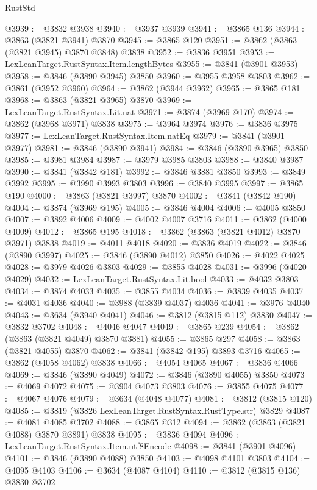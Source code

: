 \begin{lexlean}{RustStd}
\begin{coremodule}
@3939 := @3832 @3938
@3940 := @3937 @3939
@3941 := @3865 @136
@3944 := @3863 (@3821 @3941) @3870
@3945 := @3865 @120
@3951 := @3862 (@3863 (@3821 @3945) @3870 @3848) @3838
@3952 := @3836 @3951
@3953 := LexLeanTarget.RustSyntax.Item.lengthBytes
@3955 := @3841 (@3901 @3953)
@3958 := @3846 (@3890 @3945) @3850
@3960 := @3955 @3958 @3803
@3962 := @3861 (@3952 @3960)
@3964 := @3862 (@3944 @3962)
@3965 := @3865 @181
@3968 := @3863 (@3821 @3965) @3870
@3969 := LexLeanTarget.RustSyntax.Lit.nat
@3971 := @3874 (@3969 @170)
@3974 := @3862 (@3968 @3971) @3838
@3975 := @3964 @3974
@3976 := @3836 @3975
@3977 := LexLeanTarget.RustSyntax.Item.natEq
@3979 := @3841 (@3901 @3977)
@3981 := @3846 (@3890 @3941)
@3984 := @3846 (@3890 @3965) @3850
@3985 := @3981 @3984
@3987 := @3979 @3985 @3803
@3988 := @3840 @3987
@3990 := @3841 (@3842 @181)
@3992 := @3846 @3881 @3850
@3993 := @3849 @3992
@3995 := @3990 @3993 @3803
@3996 := @3840 @3995
@3997 := @3865 @190
@4000 := @3863 (@3821 @3997) @3870
@4002 := @3841 (@3842 @190)
@4004 := @3874 (@3969 @195)
@4005 := @3846 @4004
@4006 := @4005 @3850
@4007 := @3892 @4006
@4009 := @4002 @4007 @3716
@4011 := @3862 (@4000 @4009)
@4012 := @3865 @195
@4018 := @3862 (@3863 (@3821 @4012) @3870 @3971) @3838
@4019 := @4011 @4018
@4020 := @3836 @4019
@4022 := @3846 (@3890 @3997)
@4025 := @3846 (@3890 @4012) @3850
@4026 := @4022 @4025
@4028 := @3979 @4026 @3803
@4029 := @3855 @4028
@4031 := @3996 (@4020 @4029)
@4032 := LexLeanTarget.RustSyntax.Lit.bool
@4033 := @4032 @3803
@4034 := @3874 @4033
@4035 := @3855 @4034
@4036 := @3839 @4035
@4037 := @4031 @4036
@4040 := @3988 (@3839 @4037) @4036
@4041 := @3976 @4040
@4043 := @3634 (@3940 @4041)
@4046 := @3812 (@3815 @112) @3830
@4047 := @3832 @3702
@4048 := @4046 @4047
@4049 := @3865 @239
@4054 := @3862 (@3863 (@3821 @4049) @3870 @3881)
@4055 := @3865 @297
@4058 := @3863 (@3821 @4055) @3870
@4062 := @3841 (@3842 @195) @3893 @3716
@4065 := @3862 (@4058 @4062) @3838
@4066 := @4054 @4065
@4067 := @3836 @4066
@4069 := @3846 (@3890 @4049)
@4072 := @3846 (@3890 @4055) @3850
@4073 := @4069 @4072
@4075 := @3904 @4073 @3803
@4076 := @3855 @4075
@4077 := @4067 @4076
@4079 := @3634 (@4048 @4077)
@4081 := @3812 (@3815 @120)
@4085 := @3819 (@3826 LexLeanTarget.RustSyntax.RustType.str) @3829
@4087 := @4081 @4085 @3702
@4088 := @3865 @312
@4094 := @3862 (@3863 (@3821 @4088) @3870 @3891) @3838
@4095 := @3836 @4094
@4096 := LexLeanTarget.RustSyntax.Item.utf8Encode
@4098 := @3841 (@3901 @4096)
@4101 := @3846 (@3890 @4088) @3850
@4103 := @4098 @4101 @3803
@4104 := @4095 @4103
@4106 := @3634 (@4087 @4104)
@4110 := @3812 (@3815 @136) @3830 @3702

\end{coremodule}
\end{lexlean}
